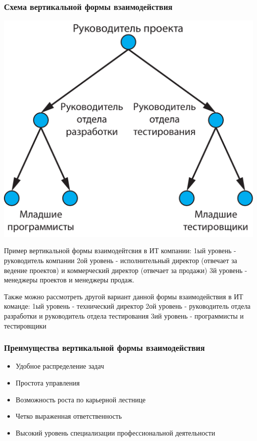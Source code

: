 \documentclass{../industrial-development}
\begin{document}
\begin{frame} \frametitle{Схема вертикальной формы взаимодействия}
	\begin{block}{}
		\centerline{\includegraphics[height=0.7\textheight]{vertical.pdf}}
	\end{block}
\end{frame}

\lecturenotes
Пример вертикальной формы взаимодейтсвия в ИТ компании:
1ый уровень - руководитель компании
2ой уровень - исполнительный директор (отвечает за ведение проектов) и коммерческий директор (отвечает за продажи)
3й уровень - менеджеры проектов и менеджеры продаж.

Также можно рассмотреть другой вариант данной формы взаимодействия в ИТ команде:
1ый уровень -  технический директор
2ой уровень -  руководитель отдела разработки и руководитель отдела тестирования
3ий уровень - программисты и тестировщики


\begin{frame} \frametitle{Преимущества вертикальной формы взаимодействия}

  
	\begin{itemize}
		\item Удобное распределение задач
		\item Простота управления
		\item Возможность роста по карьерной лестнице
		\item Четко выраженная ответственность
		\item Высокий уровень специализации профессиональной деятельности
	
	\end{itemize}
\end{frame}
\end{document}
